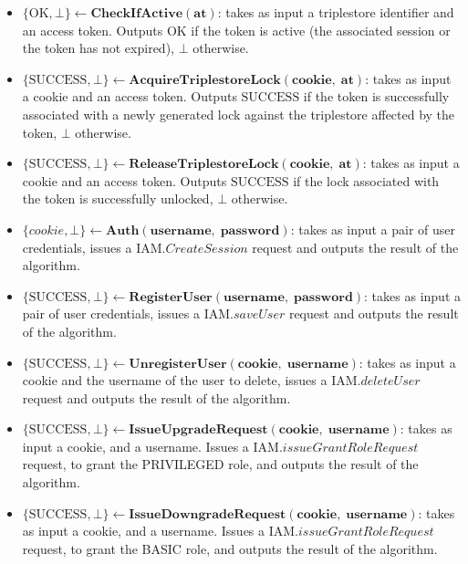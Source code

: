 \begin{definition}
\begin{itemize}
        \item $\{\textrm{OK}, \bot\} \leftarrow \mathbf{CheckIfActive(at)}$: takes as input a triplestore identifier and an access token. Outputs $\textrm{OK}$ if the token is active (the associated session or the token has not expired), $\bot$ otherwise.

        \item $\{\textrm{SUCCESS}, \bot\} \leftarrow \mathbf{AcquireTriplestoreLock(cookie, \; at)}$: takes as input a cookie and an access token. Outputs $\textrm{SUCCESS}$ if the token is successfully associated with a newly generated lock against the triplestore affected by the token, $\bot$ otherwise.

        \item $\{\textrm{SUCCESS}, \bot\} \leftarrow \mathbf{ReleaseTriplestoreLock(cookie, \; at)}$: takes as input a cookie and an access token. Outputs $\textrm{SUCCESS}$ if the lock associated with the token is successfully unlocked, $\bot$ otherwise.


        \item $\{cookie, \bot\} \leftarrow \mathbf{Auth(username, \; password)}$: takes as input a pair of user credentials, issues a $\textrm{IAM}.CreateSession$ request and outputs the result of the algorithm.

        \item $\{\textrm{SUCCESS}, \bot\} \leftarrow \mathbf{RegisterUser(username, \; password)}$: takes as input a pair of user credentials, issues a $\textrm{IAM}.saveUser$ request and outputs the result of the algorithm.

        \item $\{\textrm{SUCCESS}, \bot\} \leftarrow \mathbf{UnregisterUser(cookie, \; username)}$: takes as input a cookie and the username of the user to delete, issues a $\textrm{IAM}.deleteUser$ request and outputs the result of the algorithm.

        \item $\{\textrm{SUCCESS}, \bot\} \leftarrow  \mathbf{IssueUpgradeRequest(cookie, \; username)}$: takes as input a cookie, and a username. Issues a $\textrm{IAM}.issueGrantRoleRequest$ request, to grant the PRIVILEGED role, and outputs the result of the algorithm.

        \item $\{\textrm{SUCCESS}, \bot\} \leftarrow  \mathbf{IssueDowngradeRequest(cookie, \; username)}$: takes as input a cookie, and a username. Issues a $\textrm{IAM}.issueGrantRoleRequest$ request, to grant the BASIC role, and outputs the result of the algorithm.


\end{itemize}
\end{definition}
